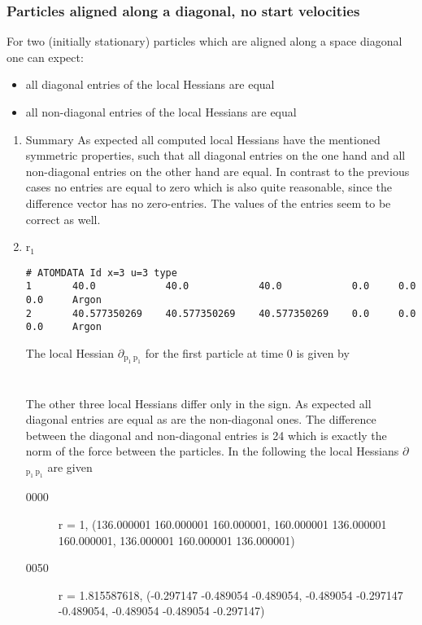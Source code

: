 \documentclass[11pt]{article}
\begin{document}
\subsubsection{Particles aligned along a diagonal, no start velocities}
\label{sec-1-4-4}
For two (initially stationary) particles which are aligned along a space diagonal one can expect:
\begin{itemize}
\item all diagonal entries of the local Hessians are equal
\item all non-diagonal entries of the local Hessians are equal
\end{itemize}
\begin{enumerate}
\item Summary
\label{sec-1-4-4-1}
As expected all computed local Hessians have the mentioned symmetric properties, such that all diagonal entries on the one hand and all non-diagonal entries on the other hand are equal.
In contrast to the previous cases no entries are equal to zero which is also quite reasonable, since the difference vector has no zero-entries.
The values of the entries seem to be correct as well.
\item r$_{\text{1}}$
\label{sec-1-4-4-2}
\begin{verbatim}
# ATOMDATA Id x=3 u=3 type
1       40.0            40.0            40.0            0.0     0.0     0.0     Argon
2       40.577350269    40.577350269    40.577350269    0.0     0.0     0.0     Argon
\end{verbatim}
The local Hessian $\partial$$_{\text{p}_{\text{1}} \ \text{p}_{\text{1}}}$ for the first particle at time 0 is given by\\
[136.000001 160.000001 160.000001]\\
[160.000001 136.000001 160.000001]\\
[136.000001 160.000001 136.000001]
The other three local Hessians differ only in the sign. As expected all diagonal entries are equal as are the non-diagonal ones.
The difference between the diagonal and non-diagonal entries is 24 which is exactly the norm of the force between the particles.
In the following the local Hessians $\partial$$_{\text{p}_{\text{1}} \ \text{p}_{\text{1}}}$ are given
\begin{description}
\item[{0000}] r = 1, (136.000001 160.000001 160.000001, 160.000001 136.000001 160.000001, 136.000001 160.000001 136.000001)
\item[{0050}] r = 1.815587618, (-0.297147 -0.489054 -0.489054, -0.489054 -0.297147 -0.489054, -0.489054 -0.489054 -0.297147)

\end{description}
\end{enumerate}
\end{document}
